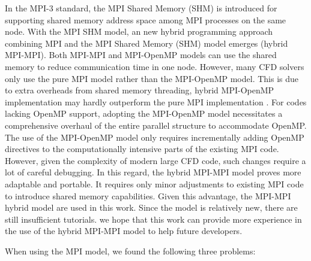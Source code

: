 In the MPI-3 standard, the MPI Shared Memory (SHM) \cite{brinskiy2017introduction} is introduced for supporting shared memory address space among MPI processes on the same node. With the MPI SHM model, an new hybrid programming approach combining MPI and the MPI Shared Memory (SHM) model emerges (hybrid MPI-MPI)\cite{hoefler2013mpi+}. Both MPI-MPI and MPI-OpenMP models can use the shared memory to reduce communication time in one node. However, many CFD solvers only use the pure MPI model rather than the MPI-OpenMP model. This is due to extra overheads from shared memory threading, hybrid MPI-OpenMP implementation may hardly outperform the pure MPI implementation \cite{rabenseifner2009hybrid}. For codes lacking OpenMP support, adopting the MPI-OpenMP model necessitates a comprehensive overhaul of the entire parallel structure to accommodate OpenMP. The use of the MPI-OpenMP model only requires incrementally adding OpenMP directives to the computationally intensive parts of the existing MPI code. However, given the complexity of modern large CFD code, such changes require a lot of careful debugging. In this regard, the hybrid MPI-MPI model proves more adaptable and portable.  It requires only minor adjustments to existing MPI code to introduce shared memory capabilities. Given this advantage, the MPI-MPI hybrid model are used in this work. Since the model is relatively new, there are still insufficient tutorials. we hope that this work can provide more experience in the use of the hybrid MPI-MPI model to help future developers.

When using the MPI model, we found the following three problems:




